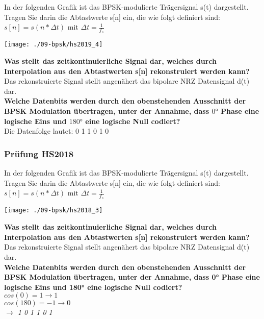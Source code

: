 In der folgenden Grafik ist das BPSK-modulierte Trägersignal s(t) dargestellt. Tragen Sie darin die Abtastwerte s[n] ein, die wie folgt definiert sind:\\
$s[n]=s(n*\Delta t)$ mit $\Delta t = \frac{1}{f_s}$
\begin{center}
    \vspace{-8pt}
    \texttt{[image: ./09-bpsk/hs2019\_4]}
    \vspace{-8pt}
\end{center}

\textbf{Was stellt das zeitkontinuierliche Signal dar, welches durch Interpolation aus den Abtastwerten s[n] rekonstruiert werden kann?}\\
Das rekonstruierte Signal stellt angenähert das bipolare NRZ Datensignal d(t) dar.\\

\textbf{Welche Datenbits werden durch den obenstehenden Ausschnitt der BPSK Modulation übertragen, unter der Annahme, dass $0°$ Phase eine logische Eins und $180°$ eine logische
Null codiert?}\\
Die Datenfolge lautet: 0 1 1 0 1 0

\subsubsection{Prüfung HS2018}

In der folgenden Grafik ist das BPSK-modulierte Trägersignal s(t) dargestellt. Tragen Sie darin die Abtastwerte s[n] ein, die wie folgt definiert sind:\\
$s[n]=s(n*\Delta t)$ mit $\Delta t=\frac{1}{f_s}$
\begin{center}
    \vspace{-8pt}
    \texttt{[image: ./09-bpsk/hs2018\_3]}
    \vspace{-8pt}
\end{center}

\textbf{Was stellt das zeitkontinuierliche Signal dar, welches durch Interpolation aus den Abtastwerten s[n] rekonstruiert werden kann?}\\
Das rekonstruierte Signal stellt angenähert das bipolare NRZ Datensignal d(t) dar.\\

\textbf{Welche Datenbits werden durch den obenstehenden Ausschnitt der BPSK Modulation übertragen, unter der Annahme, dass 0° Phase eine logische Eins und 180° eine logische
Null codiert?}\\
$cos(0)=1 \rightarrow 1$\\
$cos(180)=-1 \rightarrow 0$\\
\textit{$\rightarrow$ 1 0 1 1 0 1}


